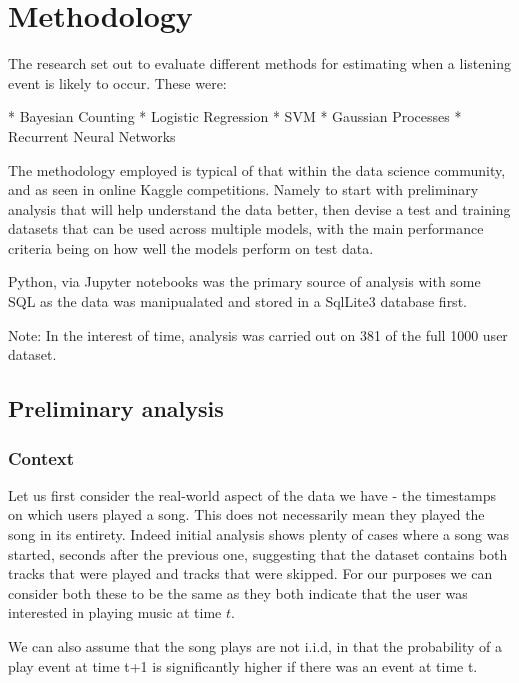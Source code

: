 
\chapter{Methodology} %

\label{Chapter3} %

The research set out to evaluate different methods for estimating when a listening event is likely to occur. These were:

* Bayesian Counting
* Logistic Regression
* SVM
* Gaussian Processes
* Recurrent Neural Networks

The methodology employed is typical of that within the data science community, and as seen in online Kaggle competitions. Namely to start with preliminary analysis that will help understand the data better, then devise a test and training datasets that can be used across multiple models, with the main performance criteria being on how well the models perform on test data.

Python, via Jupyter notebooks was the primary source of analysis with some SQL as the data was manipualated and stored in a SqlLite3 database first.

Note: In the interest of time, analysis was carried out on 381 of the full 1000 user dataset.

\section{Preliminary analysis}

\subsection{Context}

Let us first consider the real-world aspect of the data we have - the timestamps on which users played a song. This does not necessarily mean they played the song in its entirety. Indeed initial analysis shows plenty of cases where a song was started, seconds after the previous one, suggesting that the dataset contains both tracks that were played and tracks that were skipped. For our purposes we can consider both these to be the same as they both indicate that the user was interested in playing music at time $t$.

We can also assume that the song plays are not i.i.d, in that the probability of a play event at time t+1 is significantly higher if there was an event at time t. 

